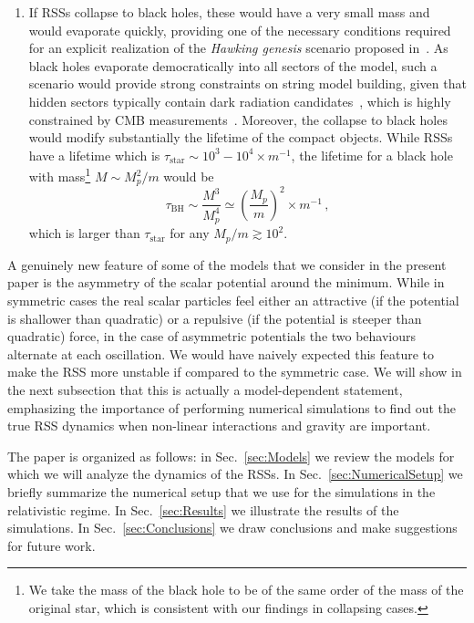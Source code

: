 \documentclass[11pt,a4paper]{article}
\begin{document}
\begin{enumerate}
\item If RSSs collapse to black holes, these would have a very small mass and would evaporate quickly, providing one of the necessary conditions required for an explicit realization of the \textit{Hawking genesis} scenario proposed in~\cite{Lennon:2017tqq}. As black holes evaporate democratically into all sectors of the model, such a scenario would provide strong constraints on string model building, given that hidden sectors typically contain dark radiation candidates~\cite{Cicoli:2012aq, Cicoli:2015bpq, Acharya:2015zfk, Halverson:2018xge, Cicoli:2018cgu}, which is highly constrained by CMB measurements~\cite{Aghanim:2018eyx}. Moreover, the collapse to black holes would modify substantially the lifetime of the compact objects. While RSSs have a lifetime which is $\tau_{\text{star}} \sim 10^3-10^4 \times m^{-1}$, the lifetime for a black hole with mass\footnote{We take the mass of the black hole to be of the same order of the mass of the original star, which is consistent with our findings in collapsing cases.} $M \sim M_p^2/m$ would be
\begin{equation}
\tau_{\text{BH}} \sim \frac{M^3}{M_p^4} \simeq \left(\frac{M_p}{m}\right)^2 \times m^{-1} \,,
\end{equation}
which is larger than $\tau_{\text{star}}$ for any $M_p/m \gtrsim 10^{2}$.
\end{enumerate}

A genuinely new feature of some of the models that we consider in the present paper is the asymmetry of the scalar potential around the minimum. While in symmetric cases the real scalar particles feel either an attractive (if the potential is shallower than quadratic) or a repulsive (if the potential is steeper than quadratic) force, in the case of asymmetric potentials the two behaviours alternate at each oscillation. We would have naively expected this feature to make the RSS more unstable if compared to the symmetric case. We will show in the next subsection that this is actually a model-dependent statement, emphasizing the importance of performing numerical simulations to find out the true RSS dynamics when non-linear interactions and gravity are important.

The paper is organized as follows: in Sec.~\ref{sec:Models} we review the models for which we will analyze the dynamics of the RSSs. In Sec.~\ref{sec:NumericalSetup} we briefly summarize the numerical setup that we use for the simulations in the relativistic regime. In Sec.~\ref{sec:Results} we illustrate the results of the simulations. In Sec.~\ref{sec:Conclusions} we draw conclusions and make suggestions for future work.
\end{document}
